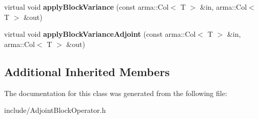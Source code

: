 \begin{DoxyCompactItemize}
\item 
virtual void {\bfseries apply\+Block\+Variance} (const arma\+::\+Col$<$ T $>$ \&in, arma\+::\+Col$<$ T $>$ \&out)\hypertarget{classkl1p_1_1TAdjointBlockOperator_a2d86c03ba6216a82b6276f13f6ac9b59}{}\label{classkl1p_1_1TAdjointBlockOperator_a2d86c03ba6216a82b6276f13f6ac9b59}

\item 
virtual void {\bfseries apply\+Block\+Variance\+Adjoint} (const arma\+::\+Col$<$ T $>$ \&in, arma\+::\+Col$<$ T $>$ \&out)\hypertarget{classkl1p_1_1TAdjointBlockOperator_acc06c3143b5de268ca95c09ab577926a}{}\label{classkl1p_1_1TAdjointBlockOperator_acc06c3143b5de268ca95c09ab577926a}

\end{DoxyCompactItemize}
\subsection*{Additional Inherited Members}


The documentation for this class was generated from the following file\+:\begin{DoxyCompactItemize}
\item 
include/Adjoint\+Block\+Operator.\+h\end{DoxyCompactItemize}
